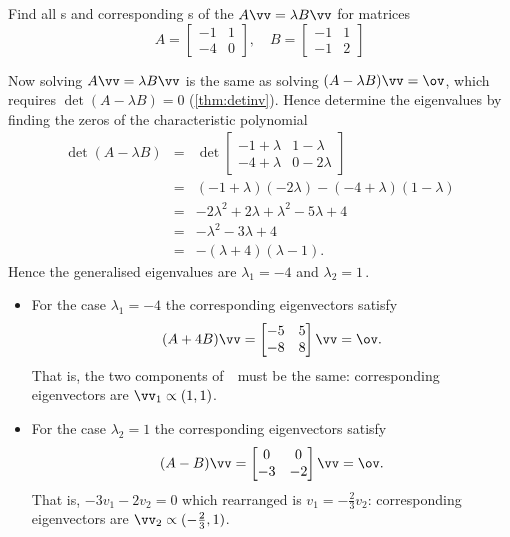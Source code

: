 \begin{example} \label{eg:}
Find all s and corresponding s of the  \(A\vv=\lambda B\vv\) for matrices
\begin{equation*}
A=\begin{bmatrix} -1&1\\-4&0 \end{bmatrix},\quad
B=\begin{bmatrix} -1&1\\-1&2 \end{bmatrix}
\end{equation*}
\begin{solution} 
Now solving \(A\vv=\lambda B\vv\) is the same as solving \((A-\lambda B)\vv=\ov\), which requires \(\det(A-\lambda B)=0\) (\autoref{thm:detinv}).
Hence determine the eigenvalues by finding the zeros of the characteristic polynomial
\begin{eqnarray*}
\det(A-\lambda B)
&=&\det\begin{bmatrix} -1+\lambda&1-\lambda\\-4+\lambda&0-2\lambda \end{bmatrix}
\\&=&(-1+\lambda)(-2\lambda)-(-4+\lambda)(1-\lambda)
\\&=&-2\lambda^2+2\lambda+\lambda^2-5\lambda+4
\\&=&-\lambda^2-3\lambda+4
\\&=&-(\lambda+4)(\lambda-1).
\end{eqnarray*}
Hence the generalised eigenvalues are \(\lambda_1=-4\) and \(\lambda_2=1\)\,.
\begin{itemize}
\item For the case \(\lambda_1=-4\) the corresponding eigenvectors satisfy
\begin{equation*}
(A+4B)\vv=\begin{bmatrix} -5&5\\-8&8 \end{bmatrix}\vv=\ov.
\end{equation*}
That is, the two components of~\vv\ must be the same: corresponding eigenvectors are \(\vv_1\propto(1,1)\).

\item For the case \(\lambda_2=1\) the corresponding eigenvectors satisfy
\begin{equation*}
(A-B)\vv=\begin{bmatrix} 0&0\\-3&-2 \end{bmatrix}\vv=\ov.
\end{equation*}
That is, \(-3v_1-2v_2=0\) which rearranged is \(v_1=-\tfrac23v_2\): corresponding eigenvectors are \(\vv_2\propto(-\tfrac23,1)\).
\end{itemize}
\end{solution}
\end{example}




